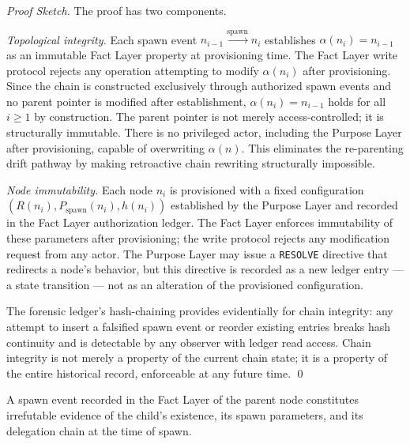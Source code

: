 \begin{proof}[Proof Sketch]
The proof has two components.

\medskip
\noindent\textit{Topological integrity.} Each spawn event $n_{i-1} \xrightarrow{\mathrm{spawn}} n_i$ establishes $\alpha(n_i) = n_{i-1}$ as an immutable Fact Layer property at provisioning time. The Fact Layer write protocol rejects any operation attempting to modify $\alpha(n_i)$ after provisioning. Since the chain is constructed exclusively through authorized spawn events and no parent pointer is modified after establishment, $\alpha(n_i) = n_{i-1}$ holds for all $i \geq 1$ by construction. The parent pointer is not merely access-controlled; it is structurally immutable. There is no privileged actor, including the Purpose Layer after provisioning, capable of overwriting $\alpha(n)$. This eliminates the re-parenting drift pathway by making retroactive chain rewriting structurally impossible.

\medskip
\noindent\textit{Node immutability.} Each node $n_i$ is provisioned with a fixed configuration $(R(n_i), P_{\mathrm{spawn}}(n_i), h(n_i))$ established by the Purpose Layer and recorded in the Fact Layer authorization ledger. The Fact Layer enforces immutability of these parameters after provisioning; the write protocol rejects any modification request from any actor. The Purpose Layer may issue a \texttt{RESOLVE} directive that redirects a node's behavior, but this directive is recorded as a new ledger entry --- a state transition --- not as an alteration of the provisioned configuration.

The forensic ledger's hash-chaining provides evidentially for chain integrity: any attempt to insert a falsified spawn event or reorder existing entries breaks hash continuity and is detectable by any observer with ledger read access. Chain integrity is not merely a property of the current chain state; it is a property of the entire historical record, enforceable at any future time. \qed
\end{proof}

\begin{prop}
\label{prop:non-repudiation}
A spawn event recorded in the Fact Layer of the parent node constitutes irrefutable evidence of the child's existence, its spawn parameters, and its delegation chain at the time of spawn.
\end{prop}

